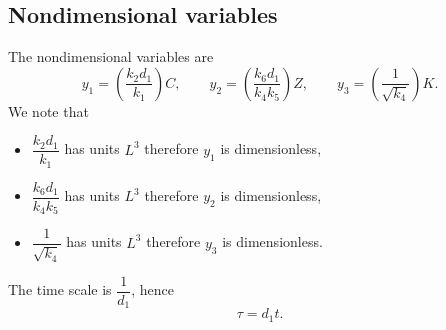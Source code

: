 \documentclass[10pt,letterpaper]{article}
\begin{document}
\subsection{Nondimensional variables}
The nondimensional variables are
\begin{equation}\label{eq:variables}
y_1 = \left(\frac{k_2 d_1}{k_1}\right) C, \qquad
y_2 = \left(\frac{k_6 d_1}{k_4 k_5}\right) Z, \qquad
y_3 = \left(\frac{1}{\sqrt{k_4}}\right) K.
\end{equation}
We note that
\begin{itemize}
  \item $\dfrac{k_2 d_1}{k_1}$ has units $L^3$ therefore $y_1$ is dimensionless,
  \item $\dfrac{k_6 d_1}{k_4 k_5}$ has units $L^3$ therefore $y_2$ is dimensionless,
  \item $\dfrac{1}{\sqrt{k_4}}$ has units $L^3$ therefore $y_3$ is dimensionless.
\end{itemize}
 The time scale is $\dfrac{1}{d_1}$, hence
\begin{equation}
\tau = d_1 t.
\end{equation}
\end{document}

